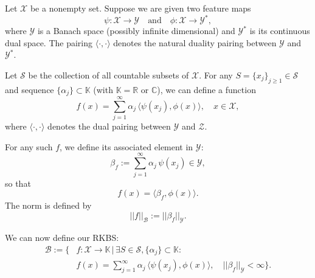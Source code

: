 Let $\mathcal{X}$ be a nonempty set. Suppose we are given two feature maps
\begin{equation}
\psi:\mathcal{X}\to \mathcal{Y} \quad \text{and} \quad \phi:\mathcal{X}\to \mathcal{Y}^*,
\end{equation}
where $\mathcal{Y}$ is a Banach space (possibly infinite dimensional) and $\mathcal{Y}^*$ is its continuous dual space. The pairing $\langle \cdot,\cdot\rangle$ denotes the natural duality pairing between $\mathcal{Y}$ and $\mathcal{Y}^*$.

\begin{definition}
Let $\mathcal{S}$ be the collection of all countable subsets of $\mathcal{X}$. For any $S = \{x_j\}_{j\ge1} \in \mathcal{S}$ and sequence $\{\alpha_j\}\subset \mathbb{K}$ (with $\mathbb{K}=\mathbb{R}$ or $\mathbb{C}$), we can define a function
\begin{equation}
f(x)= \sum_{j=1}^\infty \alpha_j\, \langle \psi(x_j), \phi(x)\rangle, \quad x\in \mathcal{X},
\end{equation}
where $\langle \cdot,\cdot\rangle$ denotes the dual pairing between $\mathcal{Y}$ and $\mathcal{Z}$.

For any such $f$, we define its associated element in $\mathcal{Y}$:
\begin{equation}
\beta_f := \sum_{j=1}^\infty \alpha_j\, \psi(x_j)\in \mathcal{Y},
\end{equation}
so that
\begin{equation}
f(x)= \langle \beta_f, \phi(x) \rangle.
\end{equation}
The norm is defined by
\begin{equation}
||f||_{\mathcal{B}} := ||\beta_f||_{\mathcal{Y}}.
\end{equation}
\end{definition}

We can now define our RKBS:
\begin{align}
\mathcal{B} := \Big\{ & f:\mathcal{X}\to \mathbb{K}\,\Big|\, \exists S \in \mathcal{S}, \{\alpha_j\} \subset \mathbb{K}: \nonumber \\
& f(x)= \sum_{j=1}^\infty \alpha_j\, \langle \psi(x_j), \phi(x)\rangle,\quad ||\beta_f||_{\mathcal{Y}} < \infty \Big\}.
\end{align}

